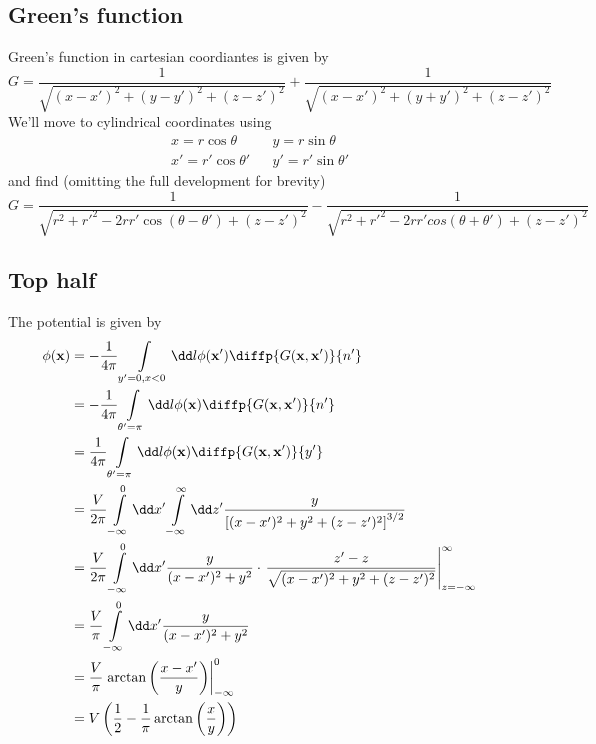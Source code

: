 \subsection{Green's function}
Green's function in cartesian coordiantes is given by
\begin{equation}
  G=\frac{1}{\sqrt{(x-x')^2+(y-y')^2+(z-z')^2}}+\frac{1}{\sqrt{(x-x')^2+(y+y')^2+(z-z')^2}}
\end{equation}
We'll move to cylindrical coordinates using
\begin{align}
	x=r\cos\theta && y=r\sin\theta\\
	x'=r'\cos\theta' && y'=r'\sin\theta'
\end{align}
and find (omitting the full development for brevity)
\begin{equation}
  G=\frac{1}{\sqrt{r^2+r'^2-2rr'\cos(\theta-\theta')+(z-z')^2}}-\frac{1}{\sqrt{r^2+r'^2-2rr'cos(\theta+\theta')+(z-z')^2}}
\end{equation}
\subsection{Top half}
The potential is given by
\begin{align}
  \phi(\bold x) &= -\frac{1}{4\pi}\int\limits_{y'=0,x<0}\dd l\phi(\bold x')\diffp{G(\bold x,\bold x')}{n'}\\
  &= -\frac{1}{4\pi}\int\limits_{\theta'=\pi}\dd l\phi(\bold x)\diffp{G(\bold x,\bold x')}{n'}\\
  &= \frac{1}{4\pi}\int\limits_{\theta'=\pi}\dd l\phi(\bold x)\diffp{G(\bold x,\bold x')}{y'}\\
  &= \frac{V}{2\pi}\int\limits_{-\infty}^0\dd x'\int\limits_{-\infty}^\infty\dd z'\frac{y}{\left[(x-x')^2+y^2+(z-z')^2\right]^{3/2}}\\
  &= \frac{V}{2\pi}\int\limits_{-\infty}^0\dd x' \frac{y}{(x-x')^2+y^2}\cdot \left.\frac{z'-z}{\sqrt{(x-x')^2+y^2+(z-z')^2}}\right|_{z=-\infty}^{\infty}\\
  &= \frac{V}{\pi}\int\limits_{-\infty}^0\dd x' \frac{y}{(x-x')^2+y^2}\\
  &= \frac{V}{\pi}\left.\arctan\left(\frac{x-x'}{y}\right)\right|_{-\infty}^0\\
  &= V\left(\frac{1}{2}-\frac{1}{\pi}\arctan\left(\frac{x}{y}\right)\right)
\end{align}
